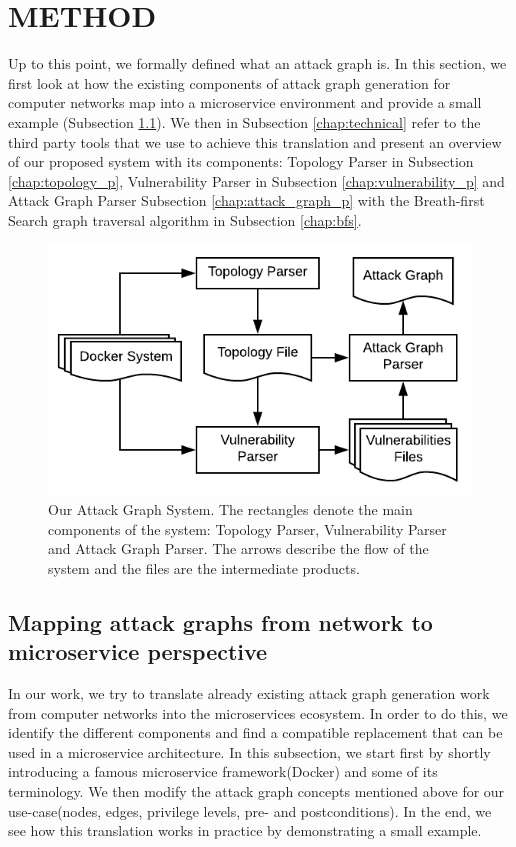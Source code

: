\section{METHOD}
Up to this point, we formally defined what an attack graph is. In this section, we first look at how the existing components of attack graph generation for computer networks map into a microservice environment and provide a small example (Subsection \ref{chap:mapping}). We then in Subsection \ref{chap:technical} refer to the third party tools that we use to achieve this translation and present an overview of our proposed system with its components: Topology Parser in Subsection \ref{chap:topology_p}, Vulnerability Parser in Subsection \ref{chap:vulnerability_p} and Attack Graph Parser Subsection \ref{chap:attack_graph_p} with the Breath-first Search graph traversal algorithm in Subsection \ref{chap:bfs}. 


\begin{figure}
	\includegraphics[scale=0.9]{./images/AttackGraphSystem}
	\caption{Our Attack Graph System. The rectangles denote the main components of the system: Topology Parser, Vulnerability Parser and Attack Graph Parser. The arrows describe the flow of the system and the files are the intermediate products.}
	\label{AttackGraphSystem}
\end{figure}

\subsection{Mapping attack graphs from network to microservice perspective}
\label{chap:mapping}

In our work, we try to translate already existing attack graph generation work from computer networks into the microservices ecosystem. In order to do this, we identify the different components and find a compatible replacement that can be used in a microservice architecture. In this subsection, we start first by shortly introducing a famous microservice framework(Docker) and some of its terminology. We then modify the attack graph concepts mentioned above for our use-case(nodes, edges, privilege levels, pre- and postconditions). In the end, we see how this translation works in practice by demonstrating a small example.

